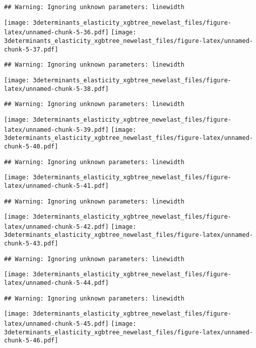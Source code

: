 \documentclass[
]{article}
\begin{document}
\begin{verbatim}
## Warning: Ignoring unknown parameters: linewidth
\end{verbatim}

\texttt{[image: 3determinants\_elasticity\_xgbtree\_newelast\_files/figure-latex/unnamed-chunk-5-36.pdf]}
\texttt{[image: 3determinants\_elasticity\_xgbtree\_newelast\_files/figure-latex/unnamed-chunk-5-37.pdf]}

\begin{verbatim}
## Warning: Ignoring unknown parameters: linewidth
\end{verbatim}

\texttt{[image: 3determinants\_elasticity\_xgbtree\_newelast\_files/figure-latex/unnamed-chunk-5-38.pdf]}

\begin{verbatim}
## Warning: Ignoring unknown parameters: linewidth
\end{verbatim}

\texttt{[image: 3determinants\_elasticity\_xgbtree\_newelast\_files/figure-latex/unnamed-chunk-5-39.pdf]}
\texttt{[image: 3determinants\_elasticity\_xgbtree\_newelast\_files/figure-latex/unnamed-chunk-5-40.pdf]}

\begin{verbatim}
## Warning: Ignoring unknown parameters: linewidth
\end{verbatim}

\texttt{[image: 3determinants\_elasticity\_xgbtree\_newelast\_files/figure-latex/unnamed-chunk-5-41.pdf]}

\begin{verbatim}
## Warning: Ignoring unknown parameters: linewidth
\end{verbatim}

\texttt{[image: 3determinants\_elasticity\_xgbtree\_newelast\_files/figure-latex/unnamed-chunk-5-42.pdf]}
\texttt{[image: 3determinants\_elasticity\_xgbtree\_newelast\_files/figure-latex/unnamed-chunk-5-43.pdf]}

\begin{verbatim}
## Warning: Ignoring unknown parameters: linewidth
\end{verbatim}

\texttt{[image: 3determinants\_elasticity\_xgbtree\_newelast\_files/figure-latex/unnamed-chunk-5-44.pdf]}

\begin{verbatim}
## Warning: Ignoring unknown parameters: linewidth
\end{verbatim}

\texttt{[image: 3determinants\_elasticity\_xgbtree\_newelast\_files/figure-latex/unnamed-chunk-5-45.pdf]}
\texttt{[image: 3determinants\_elasticity\_xgbtree\_newelast\_files/figure-latex/unnamed-chunk-5-46.pdf]}
\end{document}
